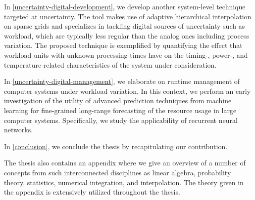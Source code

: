 In \cref{uncertainty-digital-development}, we develop another system-level
technique targeted at uncertainty. The tool makes use of adaptive hierarchical
interpolation on sparse grids and specializes in tackling digital sources of
uncertainty such as workload, which are typically less regular than the analog
ones including process variation. The proposed technique is exemplified by
quantifying the effect that workload units with unknown processing times have on
the timing-, power-, and temperature-related characteristics of the system under
consideration.

In \cref{uncertainty-digital-management}, we elaborate on runtime management of
computer systems under workload variation. In this context, we perform an early
investigation of the utility of advanced prediction techniques from machine
learning for fine-grained long-range forecasting of the resource usage in large
computer systems. Specifically, we study the applicability of recurrent neural
networks.

In \cref{conclusion}, we conclude the thesis by recapitulating our contribution.

The thesis also contains an appendix where we give an overview of a number of
concepts from such interconnected disciplines as linear algebra, probability
theory, statistics, numerical integration, and interpolation. The theory given
in the appendix is extensively utilized throughout the thesis.
